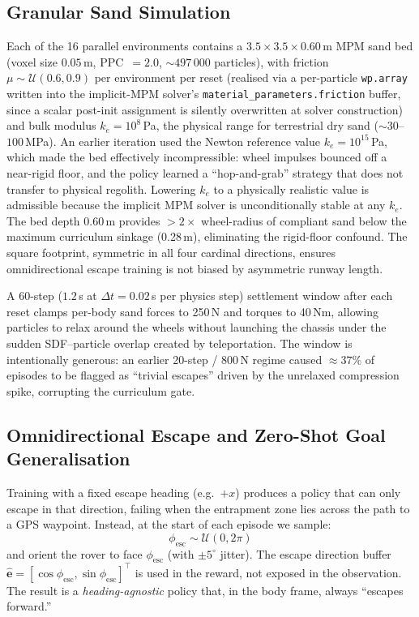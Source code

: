\documentclass[conference]{IEEEtran}
\begin{document}
\subsection{Granular Sand Simulation}
\label{sec:granular}

Each of the 16 parallel environments contains a $3.5{\times}3.5{\times}0.60$\,m
MPM sand bed (voxel size $0.05$\,m, PPC~$=2.0$, ${\sim}497\,000$ particles),
with friction $\mu \sim \mathcal{U}(0.6, 0.9)$ per environment per reset
(realised via a per-particle \texttt{wp.array} written into the implicit-MPM
solver's \texttt{material\_parameters.friction} buffer, since a scalar
post-init assignment is silently overwritten at solver construction) and bulk
modulus $k_e{=}10^{8}$\,Pa, the physical range for terrestrial dry sand
(${\sim}30$--$100$\,MPa). An earlier iteration used the Newton reference
value $k_e{=}10^{15}$\,Pa, which made the bed effectively incompressible:
wheel impulses bounced off a near-rigid floor, and the policy learned a
``hop-and-grab'' strategy that does not transfer to physical regolith.
Lowering $k_e$ to a physically realistic value is admissible because the
implicit MPM solver is unconditionally stable at any $k_e$. The bed depth
$0.60$\,m provides $>2{\times}$ wheel-radius of compliant sand below the
maximum curriculum sinkage (0.28\,m), eliminating the rigid-floor confound.
The square footprint, symmetric in all four cardinal directions, ensures
omnidirectional escape training is not biased by asymmetric runway length.

A 60-step ($1.2$\,s at $\Delta t{=}0.02$\,s per physics step) settlement
window after each reset clamps per-body sand forces to 250\,N and torques to
40\,Nm, allowing particles to relax around the wheels without launching the
chassis under the sudden SDF--particle overlap created by teleportation. The
window is intentionally generous: an earlier 20-step / 800\,N regime caused
${\approx}37\%$ of episodes to be flagged as ``trivial escapes'' driven by the
unrelaxed compression spike, corrupting the curriculum gate.

\subsection{Omnidirectional Escape and Zero-Shot Goal Generalisation}
\label{sec:omnidir}

Training with a fixed escape heading (e.g.~$+x$) produces a policy that can
only escape in that direction, failing when the entrapment zone lies across the
path to a GPS waypoint. Instead, at the start of each episode we sample:
\begin{equation}
  \phi_\text{esc} \sim \mathcal{U}(0, 2\pi)
\end{equation}
and orient the rover to face $\phi_\text{esc}$ (with $\pm5^\circ$ jitter).
The escape direction buffer $\hat{\mathbf{e}} = [\cos\phi_\text{esc},
\sin\phi_\text{esc}]^\top$ is used in the reward, not exposed in the observation.
The result is a \emph{heading-agnostic} policy that, in the body frame, always
``escapes forward.''
\end{document}
